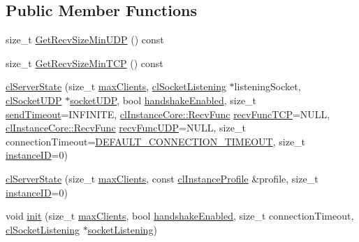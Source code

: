 \subsection*{Public Member Functions}
\begin{DoxyCompactItemize}
\item 
size\_\-t \hyperlink{classcl_server_state_af58617f6176dafbd31bf7518f28caffe}{GetRecvSizeMinUDP} () const 
\item 
size\_\-t \hyperlink{classcl_server_state_a5c90cd631cdc4b2cd323e553433d4d16}{GetRecvSizeMinTCP} () const 
\item 
\hyperlink{classcl_server_state_abf0e50dd728a1aa409d61294a618a4f6}{clServerState} (size\_\-t \hyperlink{classcl_server_state_a78bea97e597f0122863a4ee259a24785}{maxClients}, \hyperlink{classcl_socket_listening}{clSocketListening} $\ast$listeningSocket, \hyperlink{classcl_socket_u_d_p}{clSocketUDP} $\ast$\hyperlink{classcl_instance_u_d_p_adabf31cb357eb5dada6ad5c8e57c611e}{socketUDP}, bool \hyperlink{classcl_instance_t_c_p_a4a35647e926d2c2c5abec877242f69fa}{handshakeEnabled}, size\_\-t \hyperlink{classcl_instance_core_a05be31d3ac12930f23fb1a06c25b225c}{sendTimeout}=INFINITE, \hyperlink{classcl_instance_core_afa96c2a2c0b26b6a9256b87798bf9587}{clInstanceCore::RecvFunc} \hyperlink{classcl_instance_t_c_p_aae4ec2a4dd6ac904c67e53c0620e2843}{recvFuncTCP}=NULL, \hyperlink{classcl_instance_core_afa96c2a2c0b26b6a9256b87798bf9587}{clInstanceCore::RecvFunc} \hyperlink{classcl_instance_u_d_p_a71fd288aaec92fa83f45060bc15d1f1e}{recvFuncUDP}=NULL, size\_\-t connectionTimeout=\hyperlink{classcl_server_state_aa61be479aa559af84ebad2a136c2173b}{DEFAULT\_\-CONNECTION\_\-TIMEOUT}, size\_\-t \hyperlink{classcl_instance_core_ad3de74dbad74098dc2f010806186bf7f}{instanceID}=0)
\item 
\hyperlink{classcl_server_state_a9e3ba068464bfab6b9000ed412476801}{clServerState} (size\_\-t \hyperlink{classcl_server_state_a78bea97e597f0122863a4ee259a24785}{maxClients}, const \hyperlink{classcl_instance_profile}{clInstanceProfile} \&profile, size\_\-t \hyperlink{classcl_instance_core_ad3de74dbad74098dc2f010806186bf7f}{instanceID}=0)
\item 
void \hyperlink{classcl_server_state_a8752bfaf6e69d575f483fb09ad2d1ade}{init} (size\_\-t \hyperlink{classcl_server_state_a78bea97e597f0122863a4ee259a24785}{maxClients}, bool \hyperlink{classcl_instance_t_c_p_a4a35647e926d2c2c5abec877242f69fa}{handshakeEnabled}, size\_\-t connectionTimeout, \hyperlink{classcl_socket_listening}{clSocketListening} $\ast$\hyperlink{classcl_server_state_a5420d87b6c3e42c7ab033d00273ffe51}{socketListening})

\end{DoxyCompactItemize}
